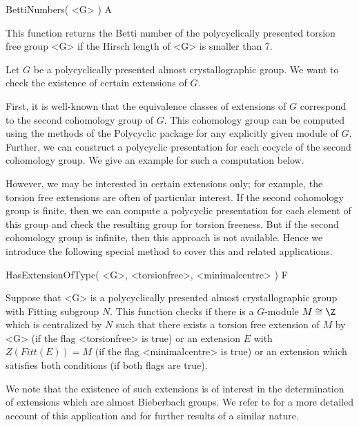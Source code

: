 \> BettiNumbers( <G> ) A

This function returns the Betti number of the polycyclically presented
torsion free group <G> if the Hirsch length of <G> is smaller than 7.


Let $G$ be a polycyclically presented almost crystallographic group. We want 
to check the existence of certain extensions of $G$. 

First, it is well-known that the equivalence classes of extensions of $G$
correspond to the second cohomology group of $G$. This cohomology group can
be computed using the methods of the {\sf Polycyclic} package for any 
explicitly given module of $G$. Further, we can construct a polycyclic
presentation for each cocycle of the second cohomology group. We give an 
example for such a computation below. 

However, we may be interested in certain extensions only; for example, 
the torsion free extensions are often of particular interest. If the 
second cohomology group is finite, then we can compute a polycyclic 
presentation for each element of this group and check the resulting group
for torsion freeness. But if the second cohomology group is infinite, then
this approach is not available. Hence we introduce the following special 
method to cover this and related applications.

\> HasExtensionOfType( <G>, <torsionfree>, <minimalcentre> ) F

Suppose that <G> is a polycyclically presented almost crystallographic group
with Fitting subgroup $N$. This function checks if there is a $G$-module 
$M \cong \Z$ which is centralized by $N$ such that there exists a torsion
free extension of $M$ by <G> (if the flag <torsionfree> is true) or an 
extension $E$ with $Z(Fitt(E)) = M$ (if the flag <minimalcentre> is true)
or an extension which satisfies both conditions (if both flags are true).

We note that the existence of such extensions is of interest in the 
determination of extensions which are almost Bieberbach groups. We refer 
to \cite{DE1} for a more detailed account of this application and for
further results of a similar nature.

